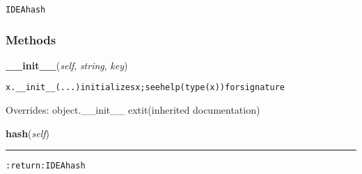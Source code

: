 \begin{alltt}
IDEA hash 
\end{alltt}



  \subsubsection{Methods}

    \vspace{0.5ex}

\hspace{.8\funcindent}\begin{boxedminipage}{\funcwidth}

    \raggedright \textbf{\_\_init\_\_}(\textit{self}, \textit{string}, \textit{key})

\setlength{\parskip}{2ex}
\begin{alltt}
x.\_\_init\_\_(...) initializes x; see help(type(x)) for signature
\end{alltt}

\setlength{\parskip}{1ex}
      Overrides: object.\_\_init\_\_ 	extit{(inherited documentation)}

    \end{boxedminipage}

    \label{hal:maths:crypt:IDEA:hash}

    \vspace{0.5ex}

\hspace{.8\funcindent}\begin{boxedminipage}{\funcwidth}

    \raggedright \textbf{hash}(\textit{self})

    \vspace{-1.5ex}

    \rule{\textwidth}{0.5\fboxrule}
\setlength{\parskip}{2ex}
\begin{alltt}

:return: IDEA hash
\end{alltt}

\setlength{\parskip}{1ex}
    \end{boxedminipage}

